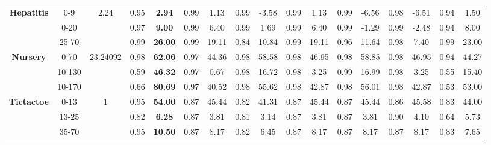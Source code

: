 \documentclass[letterpaper]{article}
\theoremstyle{definition}
\begin{document}
\begin{table}[t]
\begin{tabular}{|c|c|c|c|c|c|c|c|c|c|c|c|c|c|c|c|c|}
\multirow{3}{*}{\textbf{Hepatitis}} & 0-9       & 2.24      & 0.95  & \textbf{2.94}    & 0.99      & 1.13         & 0.99   & -3.58             & 0.99      & 1.13         & 0.99      & -6.56        & 0.98         & -6.51          & 0.94   & 1.50             \\ \cline{2-17}
                                    & 0-20      &           & 0.97  & \textbf{9.00}    & 0.99      & 6.40         & 0.99   & 1.69              & 0.99      & 6.40         & 0.99      & -1.29        & 0.99         & -2.48          & 0.94   & 8.00             \\ \cline{2-17}
                                    & 25-70     &           & 0.99  & \textbf{26.00}   & 0.99      & 19.11        & 0.84   & 10.84             & 0.99      & 19.11        & 0.96      & 11.64        & 0.98         & 7.40           & 0.99   & 23.00            \\ \hline
\multirow{3}{*}{\textbf{Nursery}}   & 0-70      & 23.24092  & 0.98  & \textbf{62.06}   & 0.97      & 44.36        & 0.98   & 58.58             & 0.98      & 46.95        & 0.98      & 58.85        & 0.98         & 46.95          & 0.94   & 44.27            \\ \cline{2-17}
                                    & 10-130    &           & 0.59  & \textbf{46.32}   & 0.97      & 0.67         & 0.98   & 16.72             & 0.98      & 3.25         & 0.99      & 16.99        & 0.98         & 3.25           & 0.55   & 15.40            \\ \cline{2-17}
                                    & 10-170    &           & 0.66  & \textbf{80.69}   & 0.97      & 40.52        & 0.98   & 55.62             & 0.98      & 42.87        & 0.98      & 56.01        & 0.98         & 42.87          & 0.53   & 53.00            \\ \hline
\multirow{3}{*}{\textbf{Tictactoe}} & 0-13      & 1         & 0.95  & \textbf{54.00}   & 0.87      & 45.44        & 0.82   & 41.31             & 0.87      & 45.44        & 0.87      & 45.44        & 0.86         & 45.58          & 0.83   & 44.00            \\ \cline{2-17}
                                    & 13-25     &           & 0.82  & \textbf{6.28}    & 0.87      & 3.81         & 0.81   & 3.14              & 0.87      & 3.81         & 0.87      & 3.81         & 0.90         & 4.10           & 0.64   & 5.73             \\ \cline{2-17}
                                    & 35-70     &           & 0.95  & \textbf{10.50}   & 0.87      & 8.17         & 0.82   & 6.45              & 0.87      & 8.17         & 0.87      & 8.17         & 0.87         & 8.17           & 0.83   & 7.65             \\ \hline

\end{tabular}
\end{table}
\end{document}
